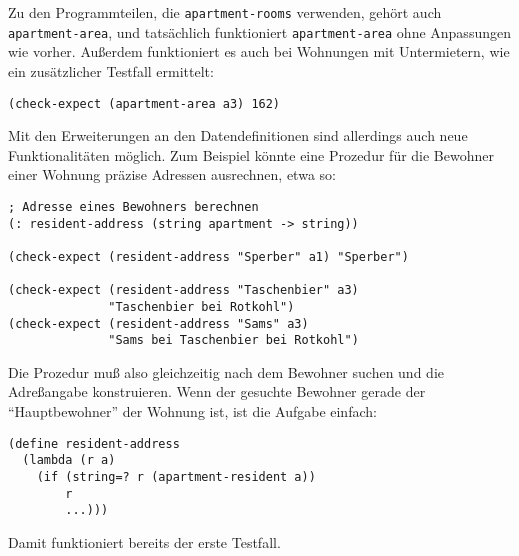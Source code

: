 Zu den Programmteilen, die \texttt{apartment-rooms} verwenden,
gehört auch \texttt{apartment-area}, und tatsächlich funktioniert
\texttt{apartment-area} ohne Anpassungen wie vorher.  Außerdem
funktioniert es auch bei Wohnungen mit Untermietern, wie ein
zusätzlicher Testfall ermittelt:
%
\begin{verbatim}
(check-expect (apartment-area a3) 162)
\end{verbatim}
%
Mit den Erweiterungen an den Datendefinitionen sind allerdings auch
neue Funktionalitäten möglich.  Zum Beispiel könnte eine Prozedur für
die Bewohner einer Wohnung präzise Adressen ausrechnen, etwa so:
%
\begin{verbatim}
; Adresse eines Bewohners berechnen
(: resident-address (string apartment -> string))

(check-expect (resident-address "Sperber" a1) "Sperber")

(check-expect (resident-address "Taschenbier" a3)
              "Taschenbier bei Rotkohl") 
(check-expect (resident-address "Sams" a3)
              "Sams bei Taschenbier bei Rotkohl")
\end{verbatim}
%
Die Prozedur muß also gleichzeitig nach dem Bewohner suchen und die
Adreßangabe konstruieren.  Wenn der gesuchte Bewohner gerade der
"`Hauptbewohner"' der Wohnung ist, ist die Aufgabe einfach:
%
\begin{verbatim}
(define resident-address
  (lambda (r a)
    (if (string=? r (apartment-resident a))
        r
        ...)))
\end{verbatim}
%
Damit funktioniert bereits der erste Testfall. 

